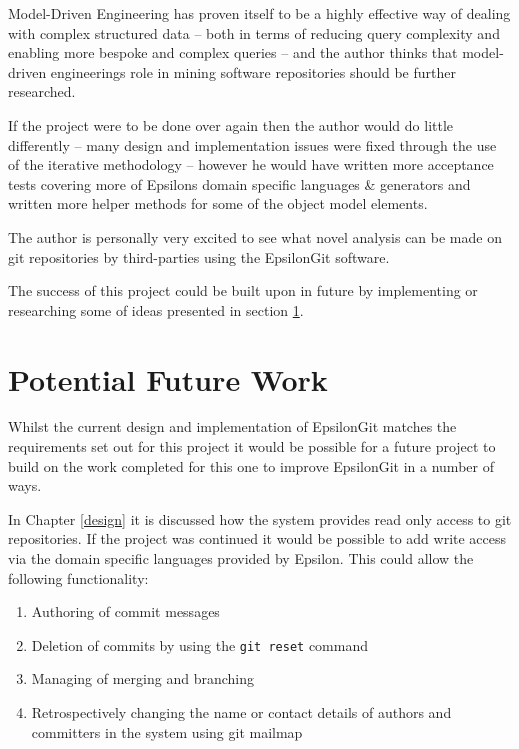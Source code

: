 \documentclass[11pt]{book}
\newcommand{\code}[1]{\texttt{#1}}
\begin{document}
Model-Driven Engineering has proven itself to be a highly effective way of dealing with complex structured data -- both in terms of reducing query complexity and enabling more bespoke and complex queries -- and the author thinks that model-driven engineerings role in mining software repositories should be further researched.

If the project were to be done over again then the author would do little differently -- many design and implementation issues were fixed through the use of the iterative methodology -- however he would have written more acceptance tests covering more of Epsilons domain specific languages \& generators and written more helper methods for some of the object model elements.

The author is personally very excited to see what novel analysis can be made on git repositories by third-parties using the EpsilonGit software.

The success of this project could be built upon in future by implementing or researching some of ideas presented in section \ref{potentialfuturework}.

\section{Potential Future Work}
\label{potentialfuturework}
Whilst the current design and implementation of EpsilonGit matches the requirements set out for this project it would be possible for a future project to build on the work completed for this one to improve EpsilonGit in a number of ways. 

In Chapter \ref{design} it is discussed how the system provides read only access to git repositories. If the project was continued it would be possible to add write access via the domain specific languages provided by Epsilon. This could allow the following functionality:

\begin{enumerate}
	\item Authoring of commit messages
	\item Deletion of commits by using the \code{git reset} command \cite{gitreset}
	\item Managing of merging and branching
	\item Retrospectively changing the name or contact details of authors and committers in the system using git mailmap \cite{gitmailmap}
\end{enumerate} 
\end{document}

